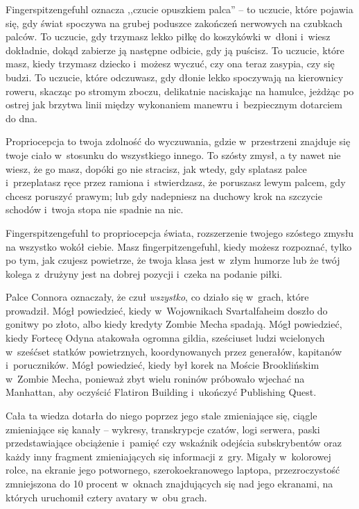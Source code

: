 \documentclass[oneside,polish,11pt,rmheadings]{mwbk}
\begin{document}
Fingerspitzengefuhl oznacza ,,czucie opuszkiem palca'' -- to uczucie, które pojawia się, gdy świat spoczywa na grubej poduszce zakończeń nerwowych na czubkach palców. To uczucie, gdy trzymasz lekko piłkę do koszykówki w~dłoni i~wiesz dokładnie, dokąd zabierze ją następne odbicie, gdy ją puścisz. To uczucie, które masz, kiedy trzymasz dziecko i~możesz wyczuć, czy ona teraz zasypia, czy się budzi. To uczucie, które odczuwasz, gdy dłonie lekko spoczywają na kierownicy roweru, skacząc po stromym zboczu, delikatnie naciskając na hamulce, jeżdżąc po ostrej jak brzytwa linii między wykonaniem manewru i~bezpiecznym dotarciem do dna.

Propriocepcja to twoja zdolność do wyczuwania, gdzie w~przestrzeni znajduje się twoje ciało w~stosunku do wszystkiego innego. To szósty zmysł, a ty nawet nie wiesz, że go masz, dopóki go nie stracisz, jak wtedy, gdy splatasz palce i~przeplatasz ręce przez ramiona i~stwierdzasz, że poruszasz lewym palcem, gdy chcesz poruszyć prawym; lub gdy nadepniesz na duchowy krok na szczycie schodów i~twoja stopa nie spadnie na nic.

Fingerspitzengefuhl to propriocepcja świata, rozszerzenie twojego szóstego zmysłu na wszystko wokół ciebie. Masz fingerpitzengefuhl, kiedy możesz rozpoznać, tylko po tym, jak czujesz powietrze, że twoja klasa jest w~złym humorze lub że twój kolega z~drużyny jest na dobrej pozycji i~czeka na podanie piłki.

Palce Connora oznaczały, że czuł \textit{wszystko}, co działo się w~grach, które prowadził. Mógł powiedzieć, kiedy w~Wojownikach Svartalfaheim doszło do gonitwy po złoto, albo kiedy kredyty Zombie Mecha spadają. Mógł powiedzieć, kiedy Fortecę Odyna atakowała ogromna gildia, sześciuset ludzi wcielonych w~sześćset statków powietrznych, koordynowanych przez generałów, kapitanów i~poruczników. Mógł powiedzieć, kiedy był korek na Moście Brooklińskim w~Zombie Mecha, ponieważ zbyt wielu roninów próbowało wjechać na Manhattan, aby oczyścić Flatiron Building i~ukończyć Publishing Quest.

Cała ta wiedza dotarła do niego poprzez jego stale zmieniające się, ciągle zmieniające się kanały -- wykresy, transkrypcje czatów, logi serwera, paski przedstawiające obciążenie i~pamięć czy wskaźnik odejścia subskrybentów oraz każdy inny fragment zmieniających się informacji z~gry. Migały w~kolorowej rolce, na ekranie jego potwornego, szerokoekranowego laptopa, przezroczystość zmniejszona do 10 procent w~oknach znajdujących się nad jego ekranami, na których uruchomił cztery avatary w~obu grach.
\end{document}

